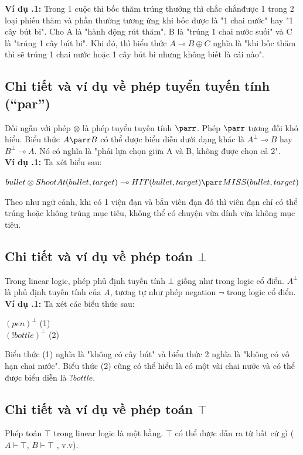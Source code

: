 \documentclass[a4paper]{article}
\begin{document}
\textbf{Ví dụ \thesubsection.1:} Trong 1 cuộc thi bốc thăm trúng thưởng thì chắc chắnđược 1 trong 2 loại phiếu thăm và phần thưởng tương ứng khi bốc được là "1 chai nước" hay "1 cây bút bi". Cho A là "hành động rút thăm", B là "trúng 1 chai nước suối" và C là "trúng 1 cây bút bi". Khi đó, thì biểu thức $A \multimap B \oplus C$ nghĩa là "khi bốc thăm thì sẽ trúng 1 chai nước hoặc 1 cây bút bi nhưng không biết là cái nào".

\subsection{Chi tiết và ví dụ về phép tuyển tuyến tính (“par”)}
Đối ngẫu với phép $\otimes$ là phép tuyển tuyến tính $\parr$. Phép $\parr$ tương đối khó hiểu. Biểu thức $A \parr B$ có thể được biểu diễn dưới dạng khác là $A^{\bot} \multimap B$ hay $B^{\bot} \multimap A$. Nó có nghĩa là "phải lựa chọn giữa A và B, không được chọn cả 2".\\

\textbf{Ví dụ \thesubsection.1:} Ta xét biểu sau:
\begin{center}
$bullet \otimes ShootAt(bullet, target) \multimap HIT(bullet, target) \parr MISS(bullet, target)$
\end{center}
Theo như ngữ cảnh, khi có 1 viện đạn và bắn viên đạn đó thì viên đạn chỉ có thể trúng hoặc không trúng mục tiêu, không thể có chuyện vừa dính vừa không mục tiêu.

\subsection{Chi tiết và ví dụ về phép toán $\bot$}
Trong linear logic, phép phủ định tuyến tính $\bot$ giống như trong logic cổ điển. $A^{\bot}$ là phủ định tuyến tính của $A$, tương tự như phép negation $\lnot$ trong logic cổ điển. \\

\textbf{Ví dụ \thesubsection.1:} Ta xét các biểu thức sau:\\
\begin{center}
    $(pen)^{\bot}$ (1)\\
    $(!bottle)^{\bot}$ (2)
\end{center}
Biểu thức (1) nghĩa là "không có cây bút" và biểu thức 2 nghĩa là "không có vô hạn chai nước". Biểu thức (2) cũng có thể hiểu là có một vài chai nước và có thể được biểu diễn là $?bottle$.

\subsection{Chi tiết và ví dụ về phép toán $\top$}
Phép toán $\top$ trong linear logic là một hằng. $\top$ có thể được dẫn ra từ bất cứ gì ($A \vdash \top$, $B \vdash \top$ , v.v).\\
\end{document}
